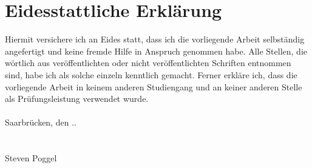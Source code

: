 
\maketitle\thispagestyle{empty}
\setcounter{page}{0}\clearpage

%

\pagestyle{empty}%


\tableofcontents


%



%

%


\chapter*{Eidesstattliche Erklärung}
\label{chap:EidesstattlicheErklaerung}

Hiermit versichere ich an Eides statt, dass ich die vorliegende Arbeit 
selbständig angefertigt und keine fremde Hilfe in Anspruch genommen habe. 
Alle Stellen, die wörtlich aus veröffentlichten oder nicht veröffentlichten 
Schriften entnommen sind, habe ich als solche einzeln kenntlich gemacht. 
Ferner erkläre ich, dass die vorliegende Arbeit in keinem anderen Studiengang und
an keiner anderen Stelle als Prüfungsleistung verwendet wurde.
\textsc{}\\
\textsc{}\\
Saarbrücken, den \the\day.\the\month.\the\year \\
\textsc{}\\
\textsc{}\\
Steven Poggel
